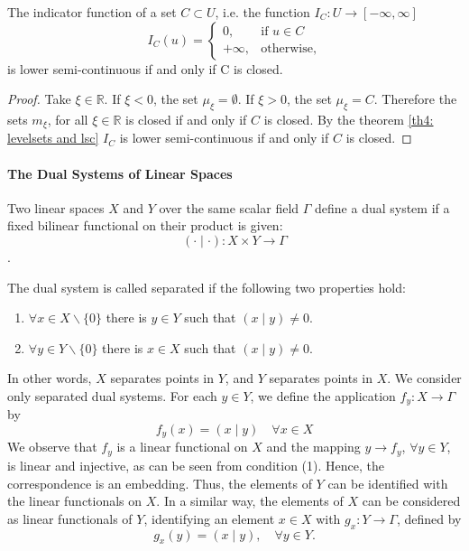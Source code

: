 \begin{example}
The indicator function of a set $C \subset U$, i.e. the function $I_C: U\rightarrow[-\infty, \infty]$
\begin{equation*}
I_C(u)=
\left\lbrace
	\begin{array}{cl}
	0, & \text{if } u \in C \\
	+\infty, & \text{otherwise},
	\end{array}
\right.
\end{equation*}
is lower semi-continuous if and only if C is closed. 
\begin{proof}
	Take $\xi \in \mathbb{R}$.  If $\xi < 0$, the set $\mu_\xi=\emptyset$. If $\xi >0$, the set $\mu_\xi = C$. Therefore the sets $m_\xi$, for all $\xi \in \mathbb{R}$ is closed if and only if $C$ is closed. By the theorem \ref{th4: levelsets and lsc} $I_C$ is lower semi-continuous if and only if $C$ is closed.
\end{proof}
\end{example}


\paragraph{The Dual Systems of Linear Spaces} 
Two linear spaces $X$ and $Y$ over the same scalar field $\Gamma$ define a dual system if a
fixed bilinear functional on their product is given:
\[(\cdot \mid \cdot) : X \times Y \rightarrow \Gamma\].


The dual system is called separated if the following two properties hold:
\begin{enumerate}
	\item $\forall x \in X \backslash \{0\}$ there is $y \in Y$ such that $(x\mid y) \neq 0$.
	\item $\forall y \in Y \backslash \{0\}$ there is $x \in X$ such that $(x\mid y) \neq 0$. 
\end{enumerate}


In other words, $X$ separates points in $Y$, and $Y$ separates points in $X$.
We consider only separated dual systems.
For each $y \in Y$, we define the application $f_y: X \rightarrow \Gamma$ by
\[f_y(x) = (x\mid y) \quad \forall x \in X\]
We observe that $f_y$ is a linear functional on $X$ and the mapping
$y \rightarrow f_y$, $\forall y \in Y$, is linear and injective, as can be seen from condition (1). Hence, the correspondence is an embedding. Thus, the elements of $Y$ can be identified with the linear functionals on $X$. In a similar way, the elements of $X$ can be considered as linear functionals of $Y$, identifying an element $x \in X$ with $g_x: Y\rightarrow \Gamma$, defined by
\[g_x(y) = (x \mid y), \quad \forall y \in Y.\]

